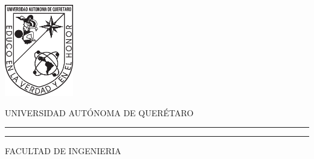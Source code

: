 \documentclass[11pt, twoside]{book}     %
\begin{document}
    \begin{titlepage}
        \thispagestyle{empty}
        \begin{minipage}[c][0.17\textheight][c]{0.25\textwidth}
            \begin{center}
                \includegraphics[height=4cm]{Recursos/Imagenes/Portada/Escudo_UAQ.png}
            \end{center}
        \end{minipage}
        \begin{minipage}[c][0.195\textheight][t]{0.75\textwidth}
            \begin{center}
                \vspace{0.3cm}
                \textsc{\large UNIVERSIDAD AUTÓNOMA DE QUERÉTARO}\\[0.5cm]
                \vspace{0.3cm}
                \hrule height2.5pt
                \vspace{.2cm}
                \hrule height1pt
                \vspace{.8cm}
                \textsc{ FACULTAD DE INGENIERIA }\\[0.5cm] %
            \end{center}
        \end{minipage}


\end{titlepage}
\end{document}
